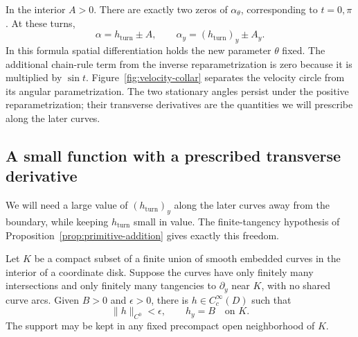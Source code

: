 In the interior $A>0$.  There are exactly two zeros of $\alpha_\theta$,
corresponding to $t=0,\pi$.  At these turns,
\begin{equation}
 \alpha=h_{\mathrm{turn}}\pm A,
 \qquad \alpha_y=(h_{\mathrm{turn}})_y\pm A_y.
 \label{eq:turn-derivative}
\end{equation}
In this formula spatial differentiation holds the new parameter
$\theta$ fixed.  The additional chain-rule term from the inverse
reparametrization is zero because it is multiplied by $\sin t$.
Figure~\ref{fig:velocity-collar} separates the velocity circle from its
angular parametrization.  The two stationary angles persist under the
positive reparametrization; their transverse derivatives are the quantities
we will prescribe along the later curves.



\subsection{A small function with a prescribed transverse derivative}

We will need a large value of $(h_{\mathrm{turn}})_y$ along the later
curves away from the boundary, while keeping $h_{\mathrm{turn}}$ small
in value.  The finite-tangency hypothesis of
Proposition~\ref{prop:primitive-addition} gives exactly this freedom.

\begin{lemma}
\label{lem:small-value-derivative}
Let $K$ be a compact subset of a finite union of smooth embedded curves
in the interior of a coordinate disk.  Suppose the curves have only
finitely many intersections and only finitely many tangencies to
$\partial_y$ near $K$, with no shared curve arcs.  Given $B>0$ and
$\epsilon>0$, there is $h\in C_c^\infty(D)$ such that
\[
 \|h\|_{C^0}<\epsilon,\qquad h_y=B\quad\text{on }K.
\]
The support may be kept in any fixed precompact open neighborhood of $K$.
\end{lemma}

